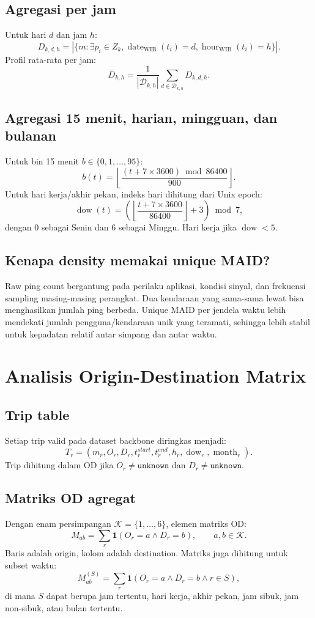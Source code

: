 \documentclass[11pt,a4paper]{article}
\newcommand{\WIB}{\text{WIB}}
\begin{document}
\subsection{Agregasi per jam}
Untuk hari $d$ dan jam $h$:
\[
D_{k,d,h}=|\{m:\exists p_i\in Z_k,\operatorname{date}_{\WIB}(t_i)=d,\operatorname{hour}_{\WIB}(t_i)=h\}|.
\]
Profil rata-rata per jam:
\[
\bar{D}_{k,h}=\frac{1}{|\mathcal{D}_{k,h}|}\sum_{d\in\mathcal{D}_{k,h}}D_{k,d,h}.
\]

\subsection{Agregasi 15 menit, harian, mingguan, dan bulanan}
Untuk bin 15 menit $b\in\{0,1,\ldots,95\}$:
\[
b(t)=\left\lfloor\frac{(t+7\times3600)\bmod86400}{900}\right\rfloor.
\]
Untuk hari kerja/akhir pekan, indeks hari dihitung dari Unix epoch:
\[
\operatorname{dow}(t)=\left(\left\lfloor\frac{t+7\times3600}{86400}\right\rfloor+3\right)\bmod7,
\]
dengan $0$ sebagai Senin dan $6$ sebagai Minggu. Hari kerja jika $\operatorname{dow}<5$.

\subsection{Kenapa density memakai unique MAID?}
Raw ping count bergantung pada perilaku aplikasi, kondisi sinyal, dan frekuensi sampling masing-masing perangkat. Dua kendaraan yang sama-sama lewat bisa menghasilkan jumlah ping berbeda. Unique MAID per jendela waktu lebih mendekati jumlah pengguna/kendaraan unik yang teramati, sehingga lebih stabil untuk kepadatan relatif antar simpang dan antar waktu.

\section{Analisis Origin-Destination Matrix}
\subsection{Trip table}
Setiap trip valid pada dataset backbone diringkas menjadi:
\[
T_r=(m_r,O_r,D_r,t_r^{start},t_r^{end},h_r,\operatorname{dow}_r,\operatorname{month}_r).
\]
Trip dihitung dalam OD jika $O_r\neq\texttt{unknown}$ dan $D_r\neq\texttt{unknown}$.

\subsection{Matriks OD agregat}
Dengan enam persimpangan $\mathcal{K}=\{1,\ldots,6\}$, elemen matriks OD:
\[
M_{ab}=\sum_r \mathbf{1}(O_r=a\land D_r=b),\qquad a,b\in\mathcal{K}.
\]
Baris adalah origin, kolom adalah destination. Matriks juga dihitung untuk subset waktu:
\[
M_{ab}^{(S)}=\sum_r \mathbf{1}(O_r=a\land D_r=b\land r\in S),
\]
di mana $S$ dapat berupa jam tertentu, hari kerja, akhir pekan, jam sibuk, jam non-sibuk, atau bulan tertentu.
\end{document}
